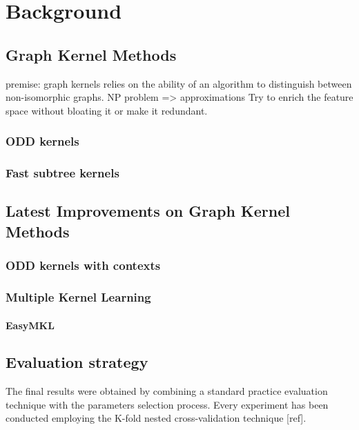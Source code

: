 
\chapter{Background} %

\label{Chapter2} %

\section{Graph Kernel Methods}
premise: graph kernels relies on the ability of an algorithm to distinguish
between non-isomorphic graphs. NP problem => approximations
Try to enrich the feature space without bloating it or make it redundant.

\subsection{ODD kernels}
\subsection{Fast subtree kernels}


\section{Latest Improvements on Graph Kernel Methods}

\subsection{ODD kernels with contexts}

\subsection{Multiple Kernel Learning}
\subsubsection{EasyMKL}


\section{Evaluation strategy}
\label{subsec:evaluation}
The final results were obtained by combining a standard practice evaluation
technique with the parameters selection process.
Every experiment has been conducted employing the K-fold nested cross-validation
technique [ref].

